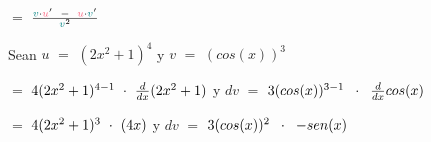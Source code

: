 \documentclass[12pt]{article}
\begin{document}
\hspace{12.85cm} $=$  {\LARGE{$\frac{{\textcolor{tealgreen}{v}} \cdot {\textcolor{wildwatermelon}{u}}^{\prime} \hspace{0.2cm} - \hspace{0.2cm} {\textcolor{wildwatermelon}{u}} \cdot {\textcolor{tealgreen}{v}}^{\prime}}{{\textcolor{tealgreen}{v}}^{2}}$}}\vspace{1cm}

{} \vspace{2cm}

Sean {\textcolor{wildwatermelon}{{\Large{$u$}}}} $=$ {\textcolor{wildwatermelon}{{$(2x^{2}+1)^{4}$}}} \hspace{.7cm} y  \hspace{4.5cm} {\textcolor{tealgreen}{{\Large{$v$}}}} $=$ {\textcolor{tealgreen}{$(cos(x))^{3}$}} \vspace{0.3cm}

 $=$ {\textcolor{wildwatermelon}{{$4(2x^{2}+1)^{4-1} \hspace{0.2cm} {\bf{\cdot}} \hspace{0.2cm} {\frac{d}{dx}} (2x^{2}+1) $}}} \hspace{.7cm} y \hspace{1.01cm} {\textcolor{tealgreen}{{\Large{$dv$}}}} $=$ {\textcolor{tealgreen}{$3(cos(x))^{3-1}\hspace{0.2cm} \cdot\hspace{0.2cm} {\frac{d}{dx}} cos(x)$}} \vspace{0.3cm}

 $=$ {\textcolor{wildwatermelon}{{$4(2x^{2}+1)^{3} \hspace{0.2cm} {\bf{\cdot}} \hspace{0.2cm} (4x) $}}} \hspace{.7cm} y \hspace{2.7cm} {\textcolor{tealgreen}{{\Large{$dv$}}}} $=$ {\textcolor{tealgreen}{$3(cos(x))^{2}\hspace{0.2cm} \cdot\hspace{0.2cm}  -sen(x)$}} \vspace{0.3cm}
\end{document}
